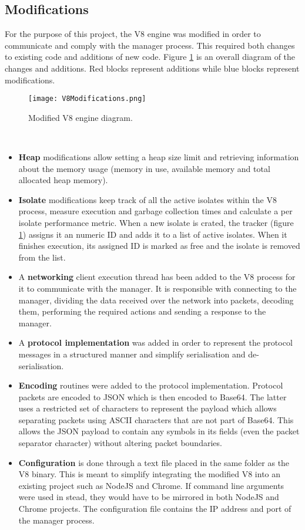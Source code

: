 \documentclass{l4proj}
\begin{document}
\subsection{Modifications}
\hspace*{1em} For the purpose of this project, the V8 engine was modified in order to communicate and comply with the manager process. This required both changes to existing code and additions of new code. Figure \ref{v8changes} is an overall diagram of the changes and additions. Red blocks represent additions while blue blocks represent modifications.
\begin{figure}[!ht]
  \centering
    \texttt{[image: V8Modifications.png]}
  \caption{Modified V8 engine diagram.}
    \label{v8changes}
\end{figure}\\
\begin{itemize}
\item \textbf{Heap} modifications allow setting a heap size limit and retrieving information about the memory usage (memory in use, available memory and total allocated heap memory). 
\item \textbf{Isolate} modifications keep track of all the active isolates within the V8 process, measure execution and garbage collection times and calculate a per isolate performance metric. When a new isolate is crated, the tracker (figure \ref{v8changes}) assigns it an numeric ID and adds it to a list of active isolates. When it finishes execution, its assigned ID is marked as free and the isolate is removed from the list.
\item A \textbf{networking} client execution thread has been added to the V8 process for it to communicate with the manager. It is responsible with connecting to the manager, dividing the data received over the network into packets, decoding them, performing the required actions and sending a response to the manager.
\item A \textbf{protocol implementation} was added in order to represent the protocol messages in a structured manner and simplify serialisation and de-serialisation.

\item \textbf{Encoding} routines were added to the protocol implementation. Protocol packets are encoded to JSON which is then encoded to Base64. The latter uses a restricted set of characters to represent the payload which allows separating packets using ASCII characters that are not part of Base64. This allows the JSON payload to contain any symbols in its fields (even the packet separator character) without altering packet boundaries.

\item \textbf{Configuration} is done through a text file placed in the same folder as the V8 binary. This is meant to simplify integrating the modified V8 into an existing project such as NodeJS and Chrome. If command line arguments were used in stead, they would have to be mirrored in both NodeJS and Chrome projects. The configuration file contains the IP address and port of the manager process.
\end{itemize}
\end{document}
